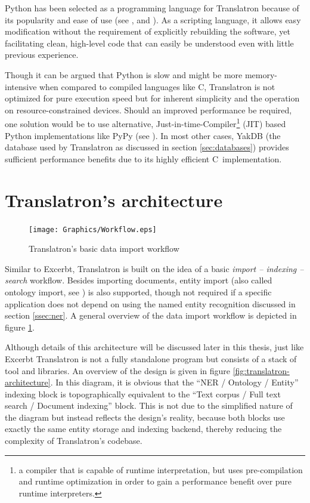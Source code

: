 \documentclass[a4paper, 12pt, twoside, reqn]{report}
\numberwithin{figure}{chapter}
\newtheorem[L]{boxedDefinition}{Definition}
\newtheorem[L]{boxedExample}{Example}
\def\CC{{C\nolinebreak[4]\hspace{-.05em}\raisebox{.4ex}{\tiny\bf ++}}}
\begin{document}
Python has been selected as a programming language for Translatron because of its popularity and ease of use (see \cite{van2007python}, \cite{king2011top} and \cite{sanner1999python}). As a scripting language, it allows easy modification without the requirement of explicitly rebuilding the software, yet facilitating clean, high-level code that can easily be understood even with little previous experience.

Though it can be argued that Python is slow and might be more memory-intensive when compared to compiled languages like \CC, Translatron is not optimized for pure execution speed but for inherent simplicity and the operation on resource-constrained devices. Should an improved performance be required, one solution would be to use alternative, Just-in-time-Compiler\footnote{a compiler that is capable of runtime interpretation, but uses pre-compilation and runtime optimization in order to gain a performance benefit over pure runtime interpreters.} (JIT) based Python implementations like PyPy (see \cite{bolz2009tracing}). In most other cases, YakDB (the database used by Translatron as discussed in section \ref{sec:databases}) provides sufficient performance benefits due to its highly efficient \CC\ implementation.

\section{Translatron's architecture}\label{sec:translatron-architecture}

\begin{figure}[!htb]
  \centering
  \texttt{[image: Graphics/Workflow.eps]}
  \caption[Translatron's data import workflow]{Translatron's basic data import workflow}
  \label{fig:import-workflow}
\end{figure}

Similar to Excerbt, Translatron is built on the idea of a basic \textit{import -- indexing -- search} workflow. Besides importing documents, entity import (also called ontology import, see \cite{wachinger2013next}) is also supported, though not required if a specific application does not depend on using the named entity recognition discussed in section \ref{ssec:ner}. A general overview of the data import workflow is depicted in figure \ref{fig:import-workflow}.

Although details of this architecture will be discussed later in this thesis, just like Excerbt Translatron is not a fully standalone program but consists of a stack of tool and libraries. An overview of the design is given in figure \ref{fig:translatron-architecture}. In this diagram, it is obvious that the ``NER / Ontology / Entity'' indexing block is topographically equivalent to the ``Text corpus / Full text search / Document indexing'' block. This is not due to the simplified nature of the diagram but instead reflects the design's reality, because both blocks use exactly the same entity storage and indexing backend, thereby reducing the complexity of Translatron's codebase.
\end{document}
